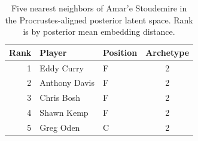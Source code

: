 \begin{table}[htbp]
  \centering\small
  \begin{tabular}{rllc}
    \toprule
    Rank & Player & Position & Archetype \\
    \midrule
    1 & Eddy Curry & F & 2 \\
    2 & Anthony Davis & F & 2 \\
    3 & Chris Bosh & F & 2 \\
    4 & Shawn Kemp & F & 2 \\
    5 & Greg Oden & C & 2 \\
    \bottomrule
  \end{tabular}
  \caption{Five nearest neighbors of Amar'e Stoudemire in the Procrustes-aligned posterior latent space. Rank is by posterior mean embedding distance.}
  \label{tab:Amar_e_Stoudemire_neighbors}
\end{table}

